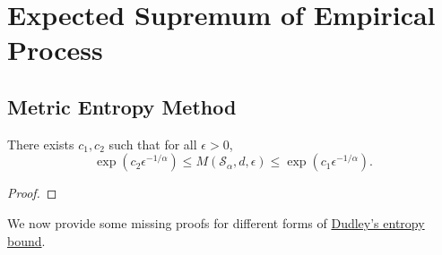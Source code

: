 \section{Expected Supremum of Empirical Process}
\subsection{Metric Entropy Method}
\begin{theorem}\label{pf-thm:metric-entropy}
	There exists \(c_1, c_2\) such that for all \(\epsilon > 0\),
	\[
		\exp \left( c_2 \epsilon ^{-1 / \alpha } \right)
		\leq M(\mathcal{S} _\alpha , d, \epsilon )
		\leq \exp \left( c_1 \epsilon ^{-1 / \alpha } \right) .
	\]
\end{theorem}
\begin{proof}

\end{proof}

We now provide some missing proofs for different forms of \hyperref[thm:Dudley-entropy-bound]{Dudley's entropy bound}.

